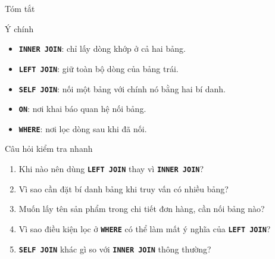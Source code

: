\documentclass[aspectratio=169,11pt]{beamer}
\newcommand{\kw}[1]{\textbf{\texttt{#1}}}
\begin{document}
\begin{frame}{Tóm tắt}
\begin{block}{Ý chính}
\begin{itemize}
  \item \kw{INNER JOIN}: chỉ lấy dòng khớp ở cả hai bảng.
  \item \kw{LEFT JOIN}: giữ toàn bộ dòng của bảng trái.
  \item \kw{SELF JOIN}: nối một bảng với chính nó bằng hai bí danh.
  \item \kw{ON}: nơi khai báo quan hệ nối bảng.
  \item \kw{WHERE}: nơi lọc dòng sau khi đã nối.
\end{itemize}
\end{block}
\end{frame}

\begin{frame}{Câu hỏi kiểm tra nhanh}
\begin{enumerate}
  \item Khi nào nên dùng \kw{LEFT JOIN} thay vì \kw{INNER JOIN}?
  \item Vì sao cần đặt bí danh bảng khi truy vấn có nhiều bảng?
  \item Muốn lấy tên sản phẩm trong chi tiết đơn hàng, cần nối bảng nào?
  \item Vì sao điều kiện lọc ở \kw{WHERE} có thể làm mất ý nghĩa của \kw{LEFT JOIN}?
  \item \kw{SELF JOIN} khác gì so với \kw{INNER JOIN} thông thường?
\end{enumerate}
\end{frame}
\end{document}
